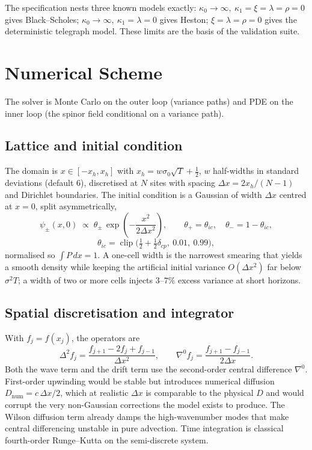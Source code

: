 \documentclass[11pt]{article}
\begin{document}
The specification nests three known models exactly:
$\kappa_0 \to \infty,\ \kappa_1 = \xi = \lambda = \rho = 0$ gives
Black--Scholes; $\kappa_0 \to \infty,\ \kappa_1 = \lambda = 0$ gives Heston;
$\xi = \lambda = \rho = 0$ gives the deterministic telegraph model. These
limits are the basis of the validation suite.

\section{Numerical Scheme}
\label{sec:num}

The solver is Monte Carlo on the outer loop (variance paths) and PDE on the
inner loop (the spinor field conditional on a variance path).

\subsection{Lattice and initial condition}

The domain is $x \in [-x_h, x_h]$ with
$x_h = w\sigma_0\sqrt{T} + \tfrac{1}{2}$, $w$ half-widths in standard
deviations (default $6$), discretised at $N$ sites with spacing
$\Delta x = 2x_h/(N-1)$ and Dirichlet boundaries. The initial condition is a
Gaussian of width $\Delta x$ centred at $x = 0$, split asymmetrically,
\begin{equation}
\psi_\pm(x, 0) \;\propto\; \theta_{\pm}\,
  \exp\!\left(-\frac{x^2}{2\Delta x^2}\right),
\qquad
\theta_+ = \theta_{ic},\quad \theta_- = 1 - \theta_{ic},
\end{equation}
\begin{equation}
\theta_{ic} = \operatorname{clip}\!\big(\tfrac{1}{2} + \tfrac{1}{2}\delta_{cp},\ 0.01,\ 0.99\big),
\label{eq:thetaic}
\end{equation}
normalised so $\int P\,dx = 1$. A one-cell width is the narrowest smearing
that yields a smooth density while keeping the artificial initial variance
$O(\Delta x^2)$ far below $\sigma^2 T$; a width of two or more cells injects
$3$--$7\%$ excess variance at short horizons.

\subsection{Spatial discretisation and integrator}

With $f_j = f(x_j)$, the operators are
\begin{equation}
\Delta^2 f_j = \frac{f_{j+1} - 2f_j + f_{j-1}}{\Delta x^2},
\qquad
\nabla^0 f_j = \frac{f_{j+1} - f_{j-1}}{2\Delta x} .
\end{equation}
Both the wave term and the drift term use the second-order central
difference $\nabla^0$. First-order upwinding would be stable but introduces
numerical diffusion $D_{\text{num}} = c\,\Delta x/2$, which at realistic
$\Delta x$ is comparable to the physical $D$ and would corrupt the very
non-Gaussian corrections the model exists to produce. The Wilson diffusion
term already damps the high-wavenumber modes that make central differencing
unstable in pure advection. Time integration is classical fourth-order
Runge--Kutta on the semi-discrete system.
\end{document}
